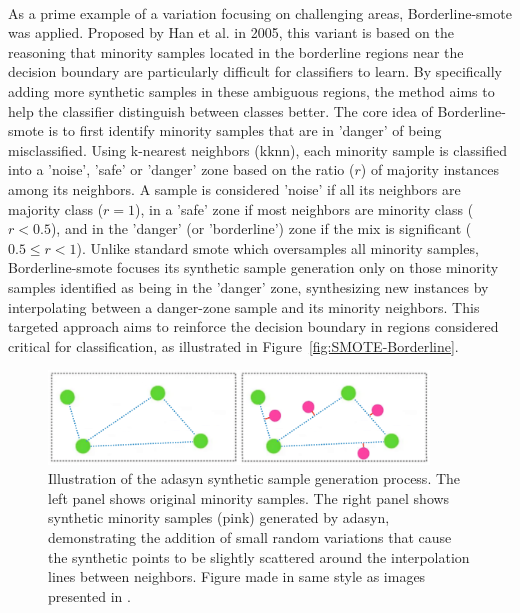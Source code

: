 \documentclass[12pt,a4paper]{report}
\begin{document}
\\
\noindent
As a prime example of a variation focusing on challenging areas, Borderline-\gls{smote} \cite{Han2005Borderline} was applied. Proposed by Han et al. in 2005, this variant is based on the reasoning that minority samples located in the borderline regions near the decision boundary are particularly difficult for classifiers to learn. By specifically adding more synthetic samples in these ambiguous regions, the method aims to help the classifier distinguish between classes better. The core idea of Borderline-\gls{smote} is to first identify minority samples that are in 'danger' of being misclassified. Using k-nearest neighbors (\acrshort{kknn}), each minority sample is classified into a 'noise', 'safe' or 'danger' zone based on the ratio ($r$) of majority instances among its neighbors. A sample is considered 'noise' if all its neighbors are majority class ($r=1$), in a 'safe' zone if most neighbors are minority class ($r < 0.5$), and in the 'danger' (or 'borderline') zone if the mix is significant ($0.5 \leq r < 1$). Unlike standard \gls{smote} which oversamples all minority samples, Borderline-\gls{smote} focuses its synthetic sample generation only on those minority samples identified as being in the 'danger' zone, synthesizing new instances by interpolating between a danger-zone sample and its minority neighbors. This targeted approach aims to reinforce the decision boundary in regions considered critical for classification, as illustrated in Figure~\ref{fig:SMOTE-Borderline}.\\
\begin{figure}[h!]
  \centering
  \includegraphics[width=0.9\textwidth]{images/SMOTE-ADASYN.png}
  \caption[Illustration of \acrshort{adasyn} Sample Generation]{Illustration of the \acrshort{adasyn} synthetic sample generation process. The left panel shows original minority samples. The right panel shows synthetic minority samples (pink) generated by \acrshort{adasyn}, demonstrating the addition of small random variations that cause the synthetic points to be slightly scattered around the interpolation lines between neighbors. Figure made in same style as images presented in \cite{Truong2022SMOTEVariants}.}
  \label{fig:SMOTE-ADASYN}
\end{figure}
\end{document}
